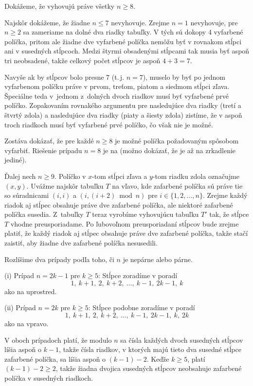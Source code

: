 {%
Dokážeme, že vyhovujú práve všetky $n\ge 8$.

Najskôr dokážeme, že žiadne $n\le 7$ nevyhovuje.
Zrejme $n=1$ nevyhovuje, pre $n\ge 2$ sa zameriame na dolné dva riadky tabuľky. V tých sú dokopy 4 vyfarbené políčka, pritom ale žiadne dve vyfarbené políčka nemôžu byť v rovnakom stĺpci ani v susedných stĺpcoch. Medzi štyrmi obsadenými stĺpcami tak musia byť aspoň tri neobsadené, takže celkový počet stĺpcov je aspoň $4+3=7$.

Navyše ak by stĺpcov bolo presne 7 (t.\,j. $n=7$), muselo by byť po jednom vyfarbenom políčku práve v prvom, treťom, piatom a siedmom stĺpci zľava. Špeciálne teda v~jednom z~dolných dvoch riadkov musí byť vyfarbené prvé políčko. Zopakovaním rovnakého argumentu pre nasledujúce dva riadky (tretí a štvrtý zdola) a nasledujúce dva riadky (piaty a šiesty zdola) zistíme, že v aspoň troch riadkoch musí byť vyfarbené prvé políčko, čo však nie je možné.

Zostáva dokázať, že pre každé $n\ge 8$ je možné políčka požadovaným spôsobom vyfarbiť.
Riešenie prípadu $n=8$ je na \obr{} (možno dokázať, že je až na zrkadlenie jediné).
%

Ďalej nech $n\ge 9$.
Políčko v $x$-tom stĺpci zľava a $y$-tom riadku zdola označujme $(x,y)$.
Uvážme najskôr tabuľku $T$ na \obr{} vľavo, kde zafarbené políčka sú práve tie so súradnicami $(i,i)$ a $(i,(i+2)\bmod n)$ pre $i\in\{1,2,\ldots,n\}$. Zrejme každý riadok aj stĺpec obsahuje práve dve zafarbené políčka, ale niektoré zafarbené políčka susedia.
Z~tabuľky $T$ teraz vyrobíme vyhovujúcu tabuľku $T'$ tak, že stĺpce $T$ vhodne preusporiadame. Po ľubovoľnom preusporiadaní stĺpcov bude zrejme platiť, že každý riadok aj stĺpec obsahuje práve dve zafarbené políčka, takže stačí zaistiť, aby žiadne dve zafarbené políčka nesusedili.
%

Rozlíšime dva prípady podľa toho, či $n$ je nepárne alebo párne.

\smallskip
\item{(i)} {Prípad $n=2k-1$ pre $k\ge 5$:}
Stĺpce zoradíme v poradí
$$1,\ k+1,\ 2,\ k+2,\ \ldots,\ k-1,\ 2k-1,\ k$$
ako na  uprostred.
\item{(ii)} {Prípad $n=2k$ pre $k\ge 5$:}
Stĺpce podobne zoradíme v poradí
$$1,\ k+1,\ 2,\ k+2,\ \ldots,\ k-1,\ 2k-1,\ k,\ 2k$$
ako na  vpravo.

\smallskip\noindent
V oboch prípadoch platí, že modulo $n$ sa čísla každých dvoch susedných stĺpcov líšia aspoň o $k-1$, takže čísla riadkov, v ktorých majú tieto dva susedné stĺpce zafarbené políčka, sa líšia aspoň o $(k-1)-2$. Keďže $k\ge 5$, platí $(k-1)-2\ge2$, takže žiadna dvojica susedných stĺpcov neobsahuje zafarbené políčka v susedných riadkoch.

}
